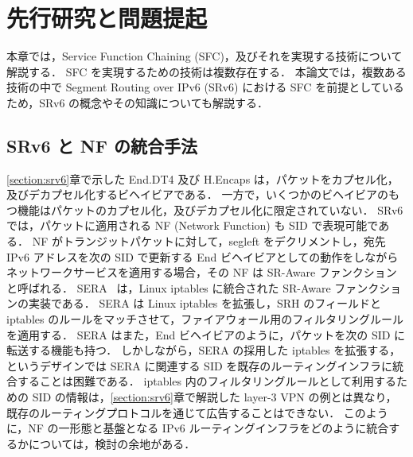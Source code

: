 \chapter{先行研究と問題提起}
\label{chap:related_works}
本章では，Service Function Chaining (SFC)，及びそれを実現する技術について解説する．
SFC を実現するための技術は複数存在する．
本論文では，複数ある技術の中で Segment Routing over IPv6 (SRv6) における SFC を前提としているため，SRv6 の概念やその知識についても解説する．

\section{SRv6 と NF の統合手法}
\label{section:srv6-and-NF}
\ref*{section:srv6}章で示した End.DT4 及び H.Encaps は，パケットをカプセル化，及びデカプセル化するビヘイビアである．
一方で，いくつかのビヘイビアのもつ機能はパケットのカプセル化，及びデカプセル化に限定されていない．
SRv6 では，パケットに適用される NF (Network Function) も SID で表現可能である．
NF がトランジットパケットに対して，segleft をデクリメントし，宛先 IPv6 アドレスを次の SID で更新する End ビヘイビアとしての動作をしながらネットワークサービスを適用する場合，その NF は SR-Aware ファンクションと呼ばれる．
SERA~\cite{sera} は，Linux iptables に統合された SR-Aware ファンクションの実装である．
SERA は Linux iptables を拡張し，SRH のフィールドと iptables のルールをマッチさせて，ファイアウォール用のフィルタリングルールを適用する．
SERA はまた，End ビヘイビアのように，パケットを次の SID に転送する機能も持つ．
しかしながら，SERA の採用した iptables を拡張する，というデザインでは SERA に関連する SID を既存のルーティングインフラに統合することは困難である．
iptables 内のフィルタリングルールとして利用するための SID の情報は，\ref*{section:srv6}章で解説した layer-3 VPN の例とは異なり，既存のルーティングプロトコルを通じて広告することはできない．
このように，NF の一形態と基盤となる IPv6 ルーティングインフラをどのように統合するかについては，検討の余地がある．

